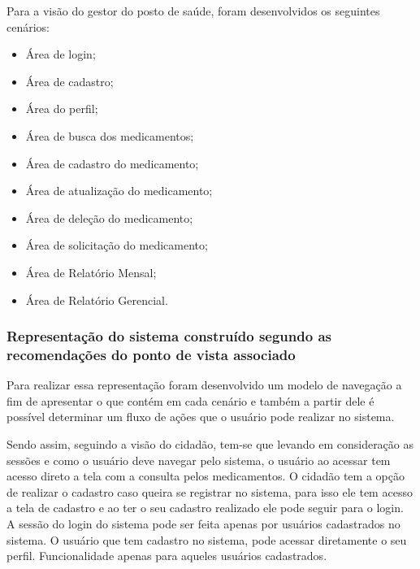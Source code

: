 Para a visão do gestor do posto de saúde, foram desenvolvidos os seguintes cenários:

\begin{itemize}
    \item Área de login;
    \item Área de cadastro;
    \item Área do perfil;
    \item Área de busca dos medicamentos;
    \item Área de cadastro do medicamento;
    \item Área de atualização do medicamento;
    \item Área de deleção do medicamento;
    \item Área de solicitação do medicamento;
    \item Área de Relatório Mensal;
    \item Área de Relatório Gerencial.
\end{itemize}

\subsubsection{Representação do sistema construído segundo as recomendações do ponto de vista associado}

Para realizar essa representação foram desenvolvido um modelo de navegação a fim de apresentar o que contém em cada cenário e também a partir dele é possível determinar um fluxo de ações que o usuário pode realizar no sistema. 

Sendo assim, seguindo a visão do cidadão, tem-se que levando em consideração as sessões e como o usuário deve navegar pelo sistema, o usuário ao acessar tem acesso direto a tela com a consulta pelos medicamentos.
O cidadão tem a opção de realizar o cadastro caso queira se registrar no sistema, para isso ele tem acesso a tela de cadastro e ao ter o seu cadastro realizado ele pode seguir para o login.
A sessão do login do sistema pode ser feita apenas por usuários cadastrados no sistema. 
O usuário que tem cadastro no sistema, pode acessar diretamente o seu perfil. Funcionalidade apenas para aqueles usuários cadastrados.

